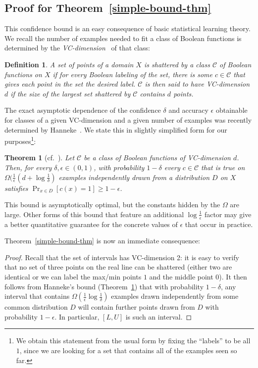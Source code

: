 \documentclass[jair,twoside,11pt,theapa]{article}
\newtheorem{theorem}{Theorem}
\newtheorem{definition}{Definition}
\begin{document}
\subsection{Proof for Theorem~\ref{simple-bound-thm}}
This confidence bound is an easy consequence of basic statistical learning theory. 
We recall the number of examples needed to fit a class of Boolean functions is determined by the {\em VC-dimension}~ of that class:
\begin{definition}
A set of points of a domain $X$ is {\em shattered} by a class $\mathcal{C}$ of Boolean functions on $X$ if for every
Boolean labeling of the set, there is some $c\in\mathcal{C}$ that gives each point in the set the desired label. $\mathcal{C}$ is then said to have {\em VC-dimension} $d$ if the size of the largest set shattered by $\mathcal{C}$ contains $d$ points.
\end{definition}
The exact asymptotic dependence of the confidence $\delta$ and accuracy $\epsilon$ obtainable for classes of a given VC-dimension and a given number of examples was recently determined by Hanneke~\citeyear{hanneke2016optimal}. We state this in slightly simplified form for our purposes\footnote{%
We obtain this statement from the usual form by fixing the ``labels'' to be all $1$, since we are looking for a set that contains all of the examples seen so far.}:
\begin{theorem}[cf.~]\label{optimalvc-bound}
Let $\mathcal{C}$ be a class of Boolean functions of VC-dimension $d$. Then, for every $\delta,\epsilon\in (0,1)$, with probability $1-\delta$ every $c\in\mathcal{C}$ that is true on $\Omega(\frac{1}{\epsilon}(d+\log\frac{1}{\delta})$ examples independently drawn from a distribution $D$ on $X$ satisfies $\Pr_{x\in D}[c(x)=1]\geq 1-\epsilon$.
\end{theorem}
This bound is asymptotically optimal, but the constants hidden by the $\Omega$ are large. 
Other forms of this bound that feature an additional $\log\frac{1}{\epsilon}$ factor may give a better quantitative guarantee for the concrete values of $\epsilon$ that occur in practice.

Theorem~\ref{simple-bound-thm} is now an immediate consequence:
\begin{proof}
Recall that the set of intervals has VC-dimension 2: it is easy to verify that no set of three points on the real line can be shattered (either two are identical or we can label the max/min points $1$ and the middle point $0$). It then follows from Hanneke's bound (Theorem~\ref{optimalvc-bound}) that with probability $1-\delta$, any interval that contains $\Omega(\frac{1}{\epsilon}\log\frac{1}{\delta})$ examples drawn independently from some common distribution $D$ will contain further points drawn from $D$ with probability $1-\epsilon$. In particular, $[L,U]$ is such an interval.
\end{proof}
\end{document}
